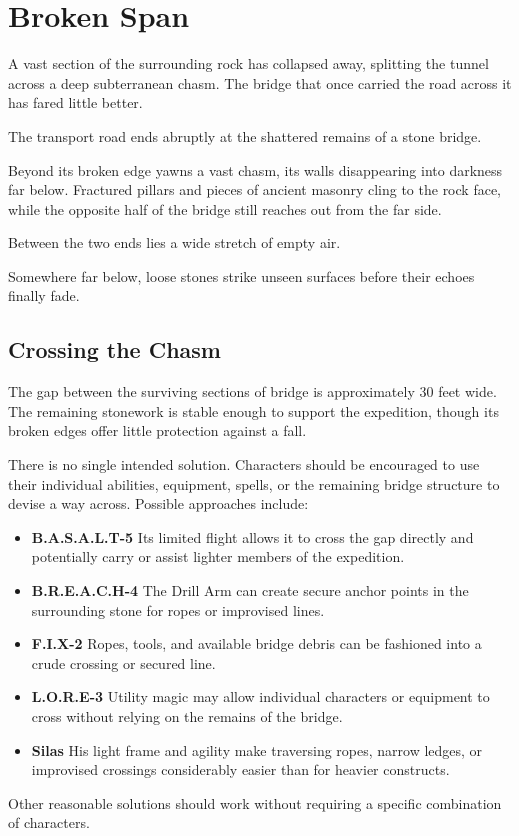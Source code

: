 \section*{ Broken Span}
{\entryfont A vast section of the surrounding rock has collapsed away, splitting the tunnel across a deep subterranean chasm. The bridge that once carried the road across it has fared little better.}
\begin{DndReadAloud}
	The transport road ends abruptly at the shattered remains of a stone bridge.

	Beyond its broken edge yawns a vast chasm, its walls disappearing into darkness far below. Fractured pillars and pieces of ancient masonry cling to the rock face, while the opposite half of the bridge still reaches out from the far side.

	Between the two ends lies a wide stretch of empty air.

	Somewhere far below, loose stones strike unseen surfaces before their echoes finally fade.
\end{DndReadAloud}
\subsection*{Crossing the Chasm}
{\entryfont The gap between the surviving sections of bridge is approximately 30 feet wide. The remaining stonework is stable enough to support the expedition, though its broken edges offer little protection against a fall.

There is no single intended solution. Characters should be encouraged to use their individual abilities, equipment, spells, or the remaining bridge structure to devise a way across. Possible approaches include:
\begin{itemize}
	\item \textbf{B.A.S.A.L.T-5} Its limited flight allows it to cross the gap directly and potentially carry or assist lighter members of the expedition.
	\item \textbf{B.R.E.A.C.H-4} The Drill Arm can create secure anchor points in the surrounding stone for ropes or improvised lines.
	\item \textbf{F.I.X-2} Ropes, tools, and available bridge debris can be fashioned into a crude crossing or secured line.
	\item \textbf{L.O.R.E-3} Utility magic may allow individual characters or equipment to cross without relying on the remains of the bridge.
	\item \textbf{Silas} His light frame and agility make traversing ropes, narrow ledges, or improvised crossings considerably easier than for heavier constructs.
\end{itemize}
\noindent Other reasonable solutions should work without requiring a specific combination of characters.}